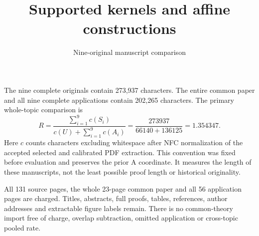 \documentclass[11pt,a4paper]{article}
\title{Supported kernels and affine constructions}
\author{Nine-original manuscript comparison}\date{}
\begin{document}
\maketitle
The nine complete originals contain 273,937 characters. The entire common paper and all nine complete applications contain 202,265 characters. The primary whole-topic comparison is
\[
 R=\frac{\sum_{i=1}^{9}c(S_i)}{c(U)+\sum_{i=1}^{9}c(A_i)}
 =\frac{273937}{66140+136125}
 =1.354347.
\]
Here $c$ counts characters excluding whitespace after NFC normalization of the accepted selected and calibrated PDF extraction. This convention was fixed before evaluation and preserves the prior A coordinate. It measures the length of these manuscripts, not the least possible proof length or historical originality.

All 131 source pages, the whole 23-page common paper and all 56 application pages are charged. Titles, abstracts, full proofs, tables, references, author addresses and extractable figure labels remain. There is no common-theory import free of charge, overlap subtraction, omitted application or cross-topic pooled rate.
\end{document}
